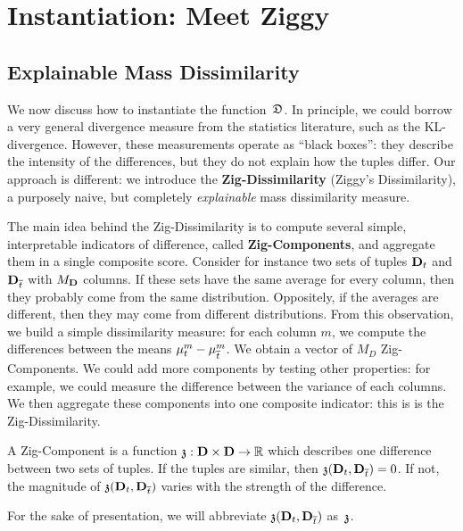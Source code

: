 \section{Instantiation: Meet Ziggy}
\label{sec:instantiation}
\subsection{Explainable Mass Dissimilarity}
\label{sec:explain}
We now discuss how to instantiate the function~$\mathfrak{D}$. In principle, we could
borrow a very general divergence measure from the statistics literature, such
as the KL-divergence. However, these measurements operate as ``black boxes'':
they describe the intensity of the differences, but they do not explain how the
tuples differ. Our approach is different: we introduce the
\textbf{Zig-Dissimilarity} (Ziggy's Dissimilarity), a purposely naive, but
completely \emph{explainable}  mass dissimilarity measure.

The main idea behind the Zig-Dissimilarity is to compute several simple,
interpretable indicators of difference, called \textbf{Zig-Components}, and
aggregate them in a single composite score.  Consider for instance two sets of
tuples $\mathbf{D}_t$ and $\mathbf{D}_{\overline{t}}$ with $M_\rb{D}$ columns. If these sets
have the same average for every column, then they probably come from the same
distribution. Oppositely, if the averages are different, then they may come
from different distributions. From this observation, we build a simple
dissimilarity measure: for each column $m$, we compute the differences between
the means $\mu^m_t - \mu^m_{\overline{t}}$. We obtain a vector of $M_D$
Zig-Components. We could add more components by testing other properties: for
example, we could measure the difference between the variance of each columns.
We then aggregate these components into one composite indicator: this is is the
Zig-Dissimilarity.

\begin{definition}
    A Zig-Component is a function $\mathfrak{z} : \mathbf{D}\times\mathbf{D} \to \mathbb{R}$
    which describes one difference between two sets of tuples. If the tuples
    are similar, then $\mathfrak{z}(\mathbf{D}_t, \mathbf{D}_{\overline{t}}) = 0$. If not,
    the magnitude of $\mathfrak{z}(\mathbf{D}_t, \mathbf{D}_{\overline{t}})$ varies with the strength
    of the difference.
\end{definition}
For the sake of presentation, we will abbreviate $\mathfrak{z}(\mathbf{D}_t,
\mathbf{D}_{\overline{t}})$ as~$\mathfrak{z}$.


